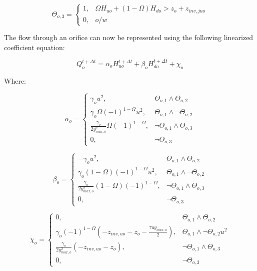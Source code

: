 \documentclass[11pt]{article}
\begin{document}
\begin{equation}
  \Theta_{o,3} = 
  \begin{cases}
    1, & \Omega H_{uo} + (1 - \Omega) H_{do} > z_o + z_{inv,juo} \\
    0, & o/w
  \end{cases}
\end{equation}

The flow through an orifice can now be represented using the following
linearized coefficient equation:

\begin{equation}
 Q_{o}^{t + \Delta t} = \alpha_{o} H_{uo}^{t + \Delta t} + \beta_{o} H_{do}^{t + \Delta t} + \chi_{o} 
\end{equation}

Where:


\begin{equation}
  \alpha_{o} =
  \begin{cases}
   \gamma_o u^2, & \Theta_{o,1} \land \Theta_{o,2}\\
   \gamma_o \Omega (-1)^{1 - \Omega} u^2, & \Theta_{o,1} \land \lnot \Theta_{o,2}\\
   \frac{\gamma_o}{2 y_{max,o}^2} \Omega (-1)^{1 - \Omega}, & \lnot \Theta_{o,1} \land \Theta_{o,3} \\
   0, & \lnot \Theta_{o,3}
  \end{cases}
\end{equation}

\begin{equation}
  \beta_{o} =
  \begin{cases}
   -\gamma_o u^2, & \Theta_{o,1} \land \Theta_{o,2}\\
   \gamma_o (1 - \Omega) (-1)^{1 - \Omega} u^2, & \Theta_{o,1} \land \lnot \Theta_{o,2}\\
   \frac{\gamma_o}{2 y_{max,o}^2} (1 - \Omega) (-1)^{1 - \Omega}, & \lnot \Theta_{o,1} \land \Theta_{o,3} \\
   0, & \lnot \Theta_{o,3}
  \end{cases}
\end{equation}

\begin{equation}
  \chi_{o} =
  \begin{cases}
   0, & \Theta_{o,1} \land \Theta_{o,2}\\
   \gamma_o (-1)^{1 - \Omega} (- z_{inv,uo} - z_o - \frac{\tau u y_{max,o}}{2}), & \Theta_{o,1} \land \lnot \Theta_{o,2} u^2\\
   \frac{\gamma_o}{2 y_{max,o}^2} (- z_{inv,uo} - z_o), & \lnot \Theta_{o,1} \land \Theta_{o,3} \\
   0, & \lnot \Theta_{o,3}
  \end{cases}
\end{equation}
\end{document}
